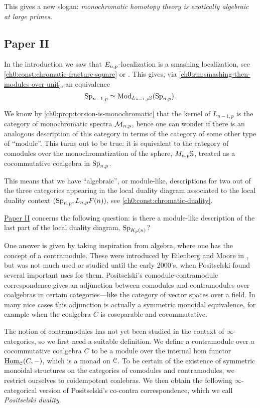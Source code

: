 This gives a new slogan: \emph{monochromatic homotopy theory is exotically algebraic at large primes.}








\subsection{Paper II}

In the introduction we saw that $E_{n,p}$-localization is a smashing localization, see \cref{ch0:const:chromatic-fracture-square} or \cite[7.5.6]{ravenel_92}. This gives, via \cref{ch0:rm:smashing-then-modules-over-unit}, an equivalence 
\[\mathrm{Sp}_{n-1,p} \simeq \mathrm{Mod}_{L_{n-1,p}\mathbb{S}}(\mathrm{Sp}_{n,p}).\]

We know by \cref{ch0:prop:torsion-is-monochromatic} that the kernel of $L_{n-1,p}$ is the category of monochromatic spectra $\mathcal{M}_{n,p}$, hence one can wonder if there is an analogous description of this category in terms of the category of some other type of ``module''. This turns out to be true: it is equivalent to the category of comodules over the monochromatization of the sphere, $M_{n,p} \mathbb{S}$, treated as a cocommutative coalgebra in $\mathrm{Sp}_{n,p}$. 

This means that we have ``algebraic'', or module-like, descriptions for two out of the three categories appearing in the local duality diagram associated to the local duality context $(\mathrm{Sp}_{n,p}, L_{n,p} F(n))$, see \cref{ch0:const:chromatic-duality}. 

\hyperref[ch2]{Paper II} concerns the following question: is there a module-like description of the last part of the local duality diagram, $\mathrm{Sp}_{K_p(n)}$? 

One answer is given by taking inspiration from algebra, where one has the concept of a contramodule. These were introduced by Eilenberg and Moore in \cite{eilenberg-moore_65}, but was not much used or studied until the early 2000's, when Positselski found several important uses for them. Positselski's comodule-contramodule correspondence gives an adjunction between comodules and contramodules over coalgebras in certain categories---like the category of vector spaces over a field. In many nice cases this adjunction is actually a symmetric monoidal equivalence, for example when the coalgebra $C$ is coseparable and cocommutative. 

The notion of contramodules has not yet been studied in the context of $\infty$-categories, so we first need a suitable definition. We define a contramodule over a cocommutative coalgebra $C$ to be a module over the internal hom functor $\operatorname{\underline{Hom}}_{\EuScript{C}}(C,-)$, which is a monad on $\EuScript{C}$. To be certain of the existence of symmetric monoidal structures on the categories of comodules and contramodules, we restrict ourselves to coidempotent coalebras. We then obtain the following $\infty$-categorical version of Positselski's co-contra correspondence, which we call \emph{Positselski duality}. 

